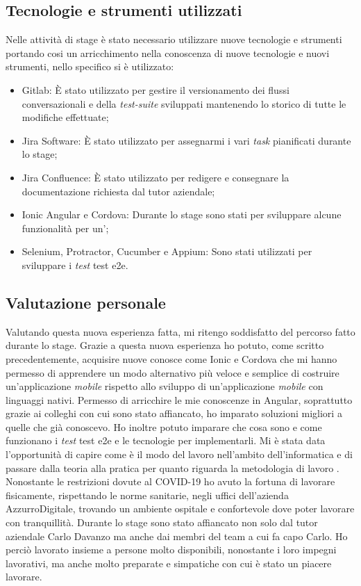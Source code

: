 \subsection{Tecnologie e strumenti utilizzati}
Nelle attività di stage è stato necessario utilizzare nuove tecnologie e strumenti portando cosi un arricchimento nella conoscenza di nuove tecnologie e nuovi strumenti, nello specifico si è utilizzato:
\begin{itemize}
	\item Gitlab: È stato utilizzato per gestire il versionamento dei flussi conversazionali e della \emph{test-suite} sviluppati mantenendo lo storico di tutte le modifiche effettuate;
	\item Jira Software: È stato utilizzato per assegnarmi i vari \emph{task} pianificati durante lo stage;
	\item Jira Confluence: È stato utilizzato per redigere e consegnare la documentazione richiesta dal tutor aziendale;
	\item Ionic Angular e Cordova: Durante lo stage sono stati per sviluppare alcune funzionalità per un';
	\item Selenium, Protractor, Cucumber e Appium: Sono stati utilizzati per sviluppare i \emph{test} \gls{test e2e}.
\end{itemize}
\subsection{Valutazione personale}
Valutando questa nuova esperienza fatta, mi ritengo soddisfatto del percorso fatto durante lo stage. Grazie a questa nuova esperienza ho potuto, come scritto precedentemente, acquisire nuove conosce come Ionic e Cordova che mi hanno permesso di apprendere un modo alternativo più veloce e semplice di costruire un’applicazione \emph{mobile} rispetto allo sviluppo di un'applicazione \emph{mobile} con linguaggi nativi. Permesso di arricchire le mie conoscenze in Angular, soprattutto grazie ai colleghi con cui sono stato affiancato, ho imparato soluzioni migliori a quelle che già conoscevo. Ho inoltre potuto imparare che cosa sono e come funzionano i \emph{test} \gls{test e2e} e le tecnologie per implementarli. Mi è stata data l'opportunità di capire come è il modo del lavoro nell'ambito dell'informatica e di passare dalla teoria alla pratica per quanto riguarda la metodologia di lavoro .
Nonostante le restrizioni dovute al COVID-19 ho avuto la fortuna di lavorare fisicamente, rispettando le norme sanitarie, negli uffici dell'azienda AzzurroDigitale, trovando un ambiente ospitale e confortevole dove poter lavorare con tranquillità.
Durante lo stage sono stato affiancato non solo dal tutor aziendale Carlo Davanzo ma anche dai membri del team a cui fa capo Carlo. Ho perciò lavorato insieme a persone molto disponibili, nonostante i loro impegni lavorativi, ma anche molto preparate e simpatiche con cui è stato un piacere lavorare. \\

